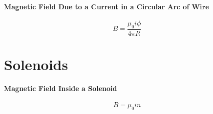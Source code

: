\documentclass{article}
\begin{document}
        \paragraph{Magnetic Field Due to a Current in a Circular Arc of Wire}
        \begin{equation}
            B = \frac{\mu_0 i \phi}{4 \pi R}
        \end{equation}

    \section{Solenoids}

        \paragraph{Magnetic Field Inside a Solenoid}
        \begin{equation}
            B = \mu_0 i n
        \end{equation}
\end{document}
